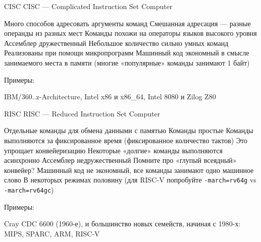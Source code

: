 \documentclass[xetex,aspectratio=43]{beamer}
\begin{document}
\begin{frame}{CISC}
    CISC — Complicated Instruction Set Computer

    \begin{outline}[itemize]
        \1 Много способов адресовать аргументы команд
        \1 Смешанная адресация — разные операнды из разных мест
        \1 Команды похожи на операторы языков высокого уровня
        \1 Ассемблер дружественный
        \1 Небольшое количество сильно умных команд
        \1 Реализованы при помощи микропрограмм
        \1 Машинный код экономный в смысле занимаемого места в памяти (многие «популярные» команды занимают 1 байт)
    \end{outline}

    Примеры:

    IBM/360..z-Architecture, Intel x86 и x86\_64, Intel 8080 и Zilog Z80
\end{frame}

\begin{frame}[fragile]{RISC}
    RISC — Reduced Instruction Set Computer

    \begin{outline}[itemize]
        \1 Отдельные команды для обмена данными с памятью
        \1 Команды простые
            \2 Команды выполняются за фиксированное время (фиксированное количество тактов)
            \2 Это упрощает конвейеризацию
        \1 Некоторые «долгие» команды выполняются асинхронно
        \1 Ассемблер недружественный
            \2 Помните про «глупый всеядный» конвейер?
        \1 Машинный код не экономный, все команды занимают одно машинное слово
            \2 В некоторых режимах половину (для RISC-V попробуйте \texttt{-march=rv64g} vs \texttt{-march=rv64gc})
    \end{outline}

    Примеры:

    Cray CDC 6600 (1960-е), и большинство новых семейств, начиная с 1980-х: MIPS, SPARC, ARM, RISC-V
\end{frame}
\end{document}
